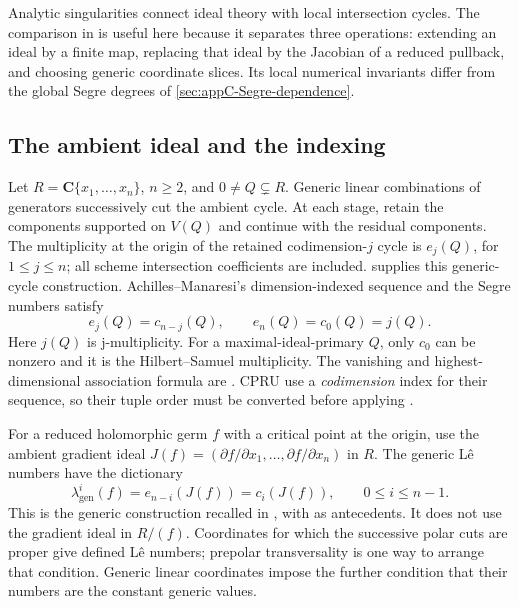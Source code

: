 Analytic singularities connect ideal theory with local intersection
cycles. The comparison in \cite{JelonekPerezSantos26SegreV1}
is useful here because it separates three operations: extending
an ideal by a finite map, replacing that ideal by the Jacobian
of a reduced pullback, and choosing generic coordinate slices.
Its local numerical invariants differ from the global Segre
degrees of \cref{sec:appC-Segre-dependence}.

\subsection{The ambient ideal and the indexing}
\label{sec:appH-Segre-local-indexing}

Let $R=\mathbf C\{x_1,\ldots,x_n\}$, $n\geq2$, and
$0\ne Q\subsetneq R$. Generic linear combinations of generators
successively cut the ambient cycle. At each stage, retain
the components supported on $V(Q)$ and continue with the
residual components. The multiplicity at the origin of the
retained codimension-$j$ cycle is $e_j(Q)$, for $1\leq j\leq n$;
all scheme intersection coefficients are included.
\cite[\S2]{GaffneyGassler96SegreV1} supplies this generic-cycle
construction. Achilles--Manaresi's dimension-indexed sequence
and the Segre numbers satisfy
\[
 e_j(Q)=c_{n-j}(Q),\qquad e_n(Q)=c_0(Q)=j(Q).
\tag{H.80}\label{eq:appH-Segre-index-conversion}
\]
Here $j(Q)$ is j-multiplicity. For a maximal-ideal-primary $Q$,
only $c_0$ can be nonzero and it is the Hilbert--Samuel
multiplicity. The vanishing and highest-dimensional association
formula are \cite[Theorem~3]{AchillesManaresi06Author}.
CPRU use a \emph{codimension} index for their sequence, so
their tuple order must be converted before applying
\cite[Corollary~6.5]{CidRuizPoliniUlrich25Author}.

For a reduced holomorphic germ $f$ with a critical point at the
origin, use the ambient gradient
ideal $J(f)=(\partial f/\partial x_1,\ldots,\partial f/\partial x_n)$
in $R$. The generic L\^e numbers have the dictionary
\[
 \lambda^i_{\mathrm{gen}}(f)=e_{n-i}(J(f))=c_i(J(f)),
 \qquad 0\leq i\leq n-1.
\tag{H.81}\label{eq:appH-Segre-Le-dictionary}
\]
This is the generic construction recalled in
\cite[\S2.3]{JelonekPerezSantos26SegreV1}, with
\cite{GaffneyGassler96SegreV1,Massey15LeCyclesV2} as antecedents.
It does not use the gradient ideal in $R/(f)$.
Coordinates for which the successive polar cuts are proper
give defined L\^e numbers; prepolar transversality is one way
to arrange that condition. Generic linear coordinates impose
the further condition that their numbers are the constant
generic values.

